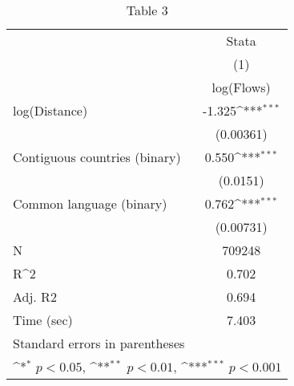 \begin{table}[htbp]\centering
\def\sym#1{\ifmmode^{#1}\else\(^{#1}\)\fi}
\caption{Table 3}
\begin{tabular}{l*{1}{c}}
\hline\hline
                    &\multicolumn{1}{c}{Stata}         \\
                    &\multicolumn{1}{c}{(1)}\\
                    &\multicolumn{1}{c}{log(Flows)}\\
\hline
log(Distance)       &      -1.325\sym{***}\\
                    &   (0.00361)         \\
[1em]
Contiguous countries (binary)&       0.550\sym{***}\\
                    &    (0.0151)         \\
[1em]
Common language (binary)&       0.762\sym{***}\\
                    &   (0.00731)         \\
\hline
N                   &      709248         \\
R^2                 &       0.702         \\
Adj. R2             &       0.694         \\
Time (sec)          &       7.403         \\
\hline\hline
\multicolumn{2}{l}{\footnotesize Standard errors in parentheses}\\
\multicolumn{2}{l}{\footnotesize \sym{*} \(p<0.05\), \sym{**} \(p<0.01\), \sym{***} \(p<0.001\)}\\
\end{tabular}
\end{table}
